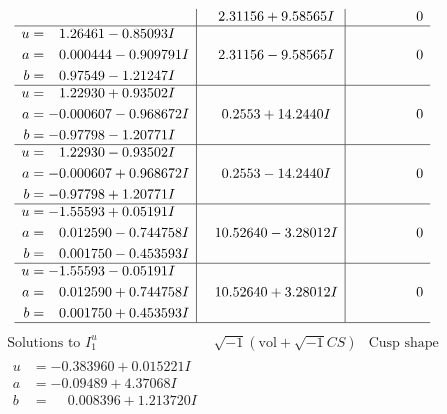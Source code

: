 \documentclass[1p]{elsarticle_modified}
\theoremstyle{definition}
\newcommand{\I}{\sqrt{-1}}
\begin{document}
$$\begin{array}{c|c|c}
 & \phantom{-}2.31156 + 9.58565 I & \phantom{-0.000000 } 0 \\ \hline\begin{aligned}
u &= \phantom{-}1.26461 - 0.85093 I \\
a &= \phantom{-}0.000444 - 0.909791 I \\
b &= \phantom{-}0.97549 - 1.21247 I\end{aligned}
 & \phantom{-}2.31156 - 9.58565 I & \phantom{-0.000000 } 0 \\ \hline\begin{aligned}
u &= \phantom{-}1.22930 + 0.93502 I \\
a &= -0.000607 - 0.968672 I \\
b &= -0.97798 - 1.20771 I\end{aligned}
 & \phantom{-}0.2553 + 14.2440 I & \phantom{-0.000000 } 0 \\ \hline\begin{aligned}
u &= \phantom{-}1.22930 - 0.93502 I \\
a &= -0.000607 + 0.968672 I \\
b &= -0.97798 + 1.20771 I\end{aligned}
 & \phantom{-}0.2553 - 14.2440 I & \phantom{-0.000000 } 0 \\ \hline\begin{aligned}
u &= -1.55593 + 0.05191 I \\
a &= \phantom{-}0.012590 - 0.744758 I \\
b &= \phantom{-}0.001750 - 0.453593 I\end{aligned}
 & \phantom{-}10.52640 - 3.28012 I & \phantom{-0.000000 } 0 \\ \hline\begin{aligned}
u &= -1.55593 - 0.05191 I \\
a &= \phantom{-}0.012590 + 0.744758 I \\
b &= \phantom{-}0.001750 + 0.453593 I\end{aligned}
 & \phantom{-}10.52640 + 3.28012 I & \phantom{-0.000000 } 0\\
 \hline 
 \end{array}$$\newpage$$\begin{array}{c|c|c}  
\text{Solutions to }I^u_{1}& \I (\text{vol} + \sqrt{-1}CS) & \text{Cusp shape}\\
 \hline 
\begin{aligned}
u &= -0.383960 + 0.015221 I \\
a &= -0.09489 + 4.37068 I \\
b &= \phantom{-}0.008396 + 1.213720 I\end{aligned}

\end{array}$$
\end{document}
